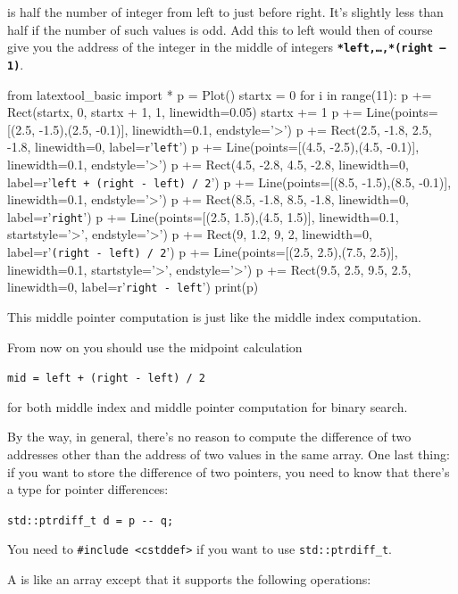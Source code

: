 is half the number of integer from left to just before right. It's slightly less than half if the number of such values is odd. Add this to left would then of course give you the address of the integer in the middle of integers \textbf{\texttt{*left,\ldots,*(right -- 1)}}.
\begin{python}
from latextool_basic import *
p = Plot()
startx = 0
for i in range(11):
    p += Rect(startx, 0, startx + 1, 1, linewidth=0.05)
    startx += 1
p += Line(points=[(2.5, -1.5),(2.5, -0.1)], linewidth=0.1, endstyle='>')
p += Rect(2.5, -1.8, 2.5, -1.8, linewidth=0, label=r'\texttt{left}')
p += Line(points=[(4.5, -2.5),(4.5, -0.1)], linewidth=0.1, endstyle='>')
p += Rect(4.5, -2.8, 4.5, -2.8, linewidth=0, label=r'\texttt{left + (right - left) / 2}')
p += Line(points=[(8.5, -1.5),(8.5, -0.1)], linewidth=0.1, endstyle='>')
p += Rect(8.5, -1.8, 8.5, -1.8, linewidth=0, label=r'\texttt{right}')
p += Line(points=[(2.5, 1.5),(4.5, 1.5)], linewidth=0.1, startstyle='>', endstyle='>')
p += Rect(9, 1.2, 9, 2, linewidth=0, label=r'\texttt{(right - left) / 2}')
p += Line(points=[(2.5, 2.5),(7.5, 2.5)], linewidth=0.1, startstyle='>', endstyle='>')
p += Rect(9.5, 2.5, 9.5, 2.5, linewidth=0, label=r'\texttt{right - left}')
print(p)
\end{python}
This middle pointer computation is just like the middle index computation.

From now on you should use the midpoint calculation

\verb!mid = left + (right - left) / 2!

for both middle index and middle pointer computation for binary search.

By the way, in general, there's no reason to compute the difference of
two addresses other than the address of two values in the same array.
One last thing: if you want to store the difference of two pointers, you
need to know that there's a type for pointer differences:

\verb!std::ptrdiff_t d = p -- q;!

You need to \verb!#include <cstddef>! if you want to use
\texttt{std::ptrdiff\_t}.



\newpage{}

A  is like an array except that it supports the following
operations:

